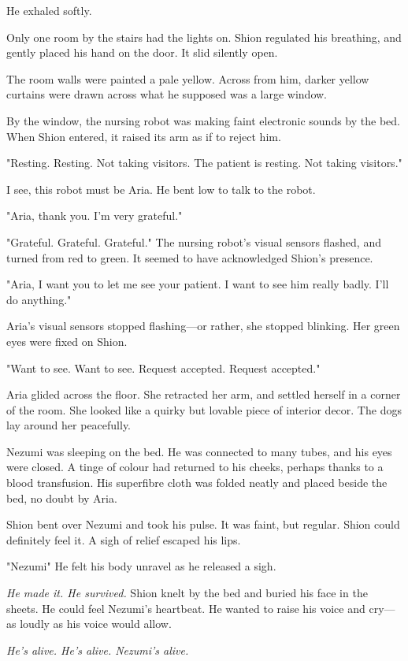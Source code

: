 He exhaled softly.

Only one room by the stairs had the lights on. Shion regulated his
breathing, and gently placed his hand on the door. It slid silently
open.

The room walls were painted a pale yellow. Across from him, darker
yellow curtains were drawn across what he supposed was a large window.

By the window, the nursing robot was making faint electronic sounds by
the bed. When Shion entered, it raised its arm as if to reject him.

{\sffamily "Resting. Resting. Not taking visitors. The patient is resting. Not
	taking visitors."}

I see, this robot must be Aria. He bent low to talk to the robot.

"Aria, thank you. I'm very grateful."

{\sffamily "Grateful. Grateful. Grateful."} The nursing robot's visual sensors
flashed, and turned from red to green. It seemed to have acknowledged
Shion's presence.

{\sffamily "Aria, I want you to let me see your patient. I want to see him really
	badly. I'll do anything."}

Aria's visual sensors stopped flashing---or rather, she stopped blinking.
Her green eyes were fixed on Shion.

"Want to see. Want to see. Request accepted. Request accepted."

Aria glided across the floor. She retracted her arm, and settled herself
in a corner of the room. She looked like a quirky but lovable piece of
interior decor. The dogs lay around her peacefully.

Nezumi was sleeping on the bed. He was connected to many tubes, and his
eyes were closed. A tinge of colour had returned to his cheeks, perhaps
thanks to a blood transfusion. His superfibre cloth was folded neatly
and placed beside the bed, no doubt by Aria.

Shion bent over Nezumi and took his pulse. It was faint, but regular.
Shion could definitely feel it. A sigh of relief escaped his lips.

"Nezumi\el " He felt his body unravel as he released a sigh.

\emph{He made it. He survived.} Shion knelt by the bed and buried his face in
the sheets. He could feel Nezumi's heartbeat. He wanted to raise his
voice and cry---as loudly as his voice would allow.

\emph{He's alive. He's alive. Nezumi's alive.}

